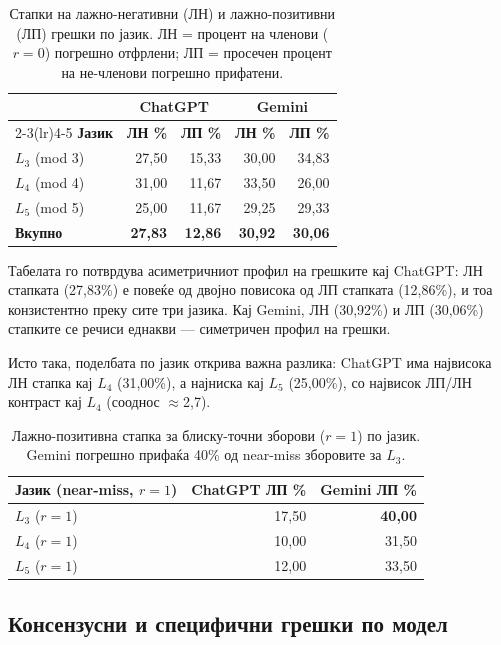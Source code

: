 \documentclass[12pt,a4paper]{article}
\theoremstyle{definition}
\begin{document}
\begin{table}[H]
\centering
\begin{tabular}{lrrrr}
\toprule
 & \multicolumn{2}{c}{\textbf{ChatGPT}} & \multicolumn{2}{c}{\textbf{Gemini}} \\
\cmidrule(lr){2-3}\cmidrule(lr){4-5}
\textbf{Јазик} & \textbf{ЛН \%} & \textbf{ЛП \%} & \textbf{ЛН \%} & \textbf{ЛП \%} \\
\midrule
$L_3$ (mod 3) & 27,50 & 15,33 & 30,00 & 34,83 \\
$L_4$ (mod 4) & 31,00 & 11,67 & 33,50 & 26,00 \\
$L_5$ (mod 5) & 25,00 & 11,67 & 29,25 & 29,33 \\
\midrule
\textbf{Вкупно} & \textbf{27,83} & \textbf{12,86} & \textbf{30,92} & \textbf{30,06} \\
\bottomrule
\end{tabular}
\caption{Стапки на лажно-негативни (ЛН) и лажно-позитивни (ЛП) грешки по јазик. ЛН = процент на членови ($r=0$) погрешно отфрлени; ЛП = просечен процент на не-членови погрешно прифатени.}
\label{tab:error_direction}
\end{table}

Табелата го потврдува асиметричниот профил на грешките кај ChatGPT: ЛН стапката (27,83\%) е повеќе од двојно повисока од ЛП стапката (12,86\%), и тоа конзистентно преку сите три јазика. Кај Gemini, ЛН (30,92\%) и ЛП (30,06\%) стапките се речиси еднакви --- симетричен профил на грешки.

Исто така, поделбата по јазик открива важна разлика: ChatGPT има највисока ЛН стапка кај $L_4$ (31,00\%), а најниска кај $L_5$ (25,00\%), со највисок ЛП/ЛН контраст кај $L_4$ (сооднос $\approx$2,7).

\begin{table}[H]
\centering
\begin{tabular}{lrr}
\toprule
\textbf{Јазик (near-miss, $r=1$)} & \textbf{ChatGPT ЛП \%} & \textbf{Gemini ЛП \%} \\
\midrule
$L_3$ ($r=1$) & 17,50 & \textbf{40,00} \\
$L_4$ ($r=1$) & 10,00 & 31,50 \\
$L_5$ ($r=1$) & 12,00 & 33,50 \\
\bottomrule
\end{tabular}
\caption{Лажно-позитивна стапка за блиску-точни зборови ($r=1$) по јазик. Gemini погрешно прифаќа 40\% од near-miss зборовите за $L_3$.}
\label{tab:fp_nearmiss}
\end{table}

\subsection{Консензусни и специфични грешки по модел}
\end{document}
